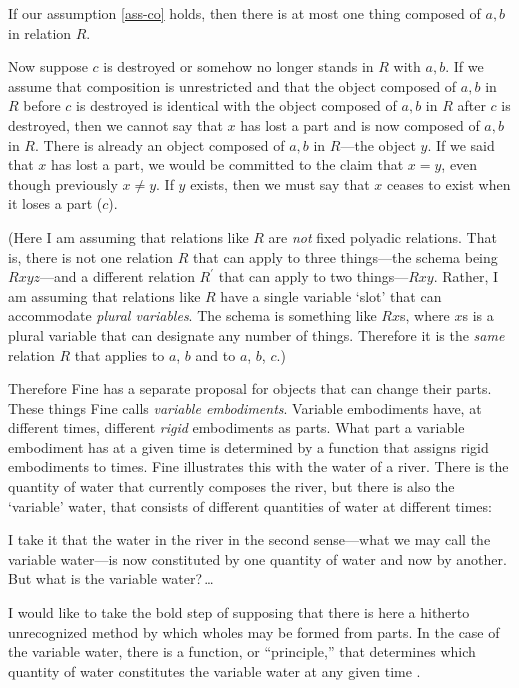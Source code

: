 \documentclass[11pt]{article}
\newenvironment{squote}{%
\begin{spacing}{1}
\begin{list}{}{%
\setlength{\labelwidth}{0pt}%
\rightmargin\leftmargin%
}
\item\relax
}{%
\end{list}%
\end{spacing}
}
\begin{document}
\begin{spacing}{1.5}
If our assumption \ref{ass-co} holds, then there is at most one thing
composed of $a, b$ in relation $R$.

Now suppose $c$ is destroyed or somehow no longer stands in $R$ with
$a, b$.  If we assume that composition is unrestricted and that the
object composed of $a, b$ in $R$ before $c$ is destroyed is identical
with the object composed of $a, b$ in $R$ after $c$ is destroyed, then
we cannot say that $x$ has lost a part and is now composed of $a, b$
in $R$.  There is already an object composed of $a, b$ in $R$---the
object $y$.  If we said that $x$ has lost a part, we would be
committed to the claim that $x = y$, even though previously $x \neq
y$.  If $y$ exists, then we must say that $x$ ceases to exist when it
loses a part ($c$).

(Here I am assuming that relations like $R$ are {\em not} fixed
polyadic relations.  That is, there is not one relation $R$ that can
apply to three things---the schema being $Rxyz$---and a different
relation $R^{\prime}$ that can apply to two things---$Rxy$.  Rather, I
am assuming that relations like $R$ have a single variable `slot' that
can accommodate {\em plural variables}.  The schema is something like
$Rx$s, where $x$s is a plural variable that can designate any number
of things.  Therefore it is the {\em same} relation $R$ that applies
to $a$, $b$ and to $a$, $b$, $c$.)

Therefore Fine has a separate proposal for objects that can change
their parts.  These things Fine calls {\em variable embodiments}.
Variable embodiments have, at different times, different {\em rigid}
embodiments as parts.  What part a variable embodiment has at a given
time is determined by a function that assigns rigid embodiments to
times.  Fine illustrates this with the water of a river.  There is the
quantity of water that currently composes the river, but there is also
the `variable' water, that consists of different quantities of water
at different times:

\begin{squote}
I take it that the water in the river in the second sense---what we may
call the variable water---is now constituted by one quantity of water
and now by another. But what is the variable water?\,\ldots

I would like to take the bold step of supposing that there is here a
hitherto unrecognized method by which wholes may be formed from parts.
In the case of the variable water, there is a function, or
``principle,'' that determines which quantity of water constitutes the
variable water at any given time \citeyearpar[68]{fine1999}.
\end{squote}


\end{spacing}
\end{document}
